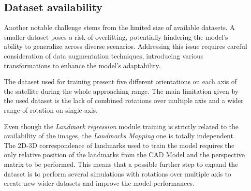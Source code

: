 \subsection{Dataset availability}
\label{Chapter4/DatasetAv}
Another notable challenge stems from the limited size of available datasets. A smaller dataset poses a risk of overfitting, potentially hindering the model's ability to generalize across diverse scenarios. Addressing this issue requires careful consideration of data augmentation techniques, introducing various transformations to enhance the model's adaptability.

The dataset used for training present five different orientations on each axis of the satellite during the whole approaching range. The main limitation given by the used dataset is the lack of combined rotations over multiple axis and a wider range of rotation on single axis.

Even though the \textit{Landmark regression} module training is strictly related to the availability of the images, the \textit{Landmarks Mapping} one is totally independent. The 2D-3D correspondence of landmarks used to train the model requires the only relative position of the landmarks from the CAD Model and the perspective matrix to be performed. This means that a possible further step to expand the dataset is to perform several simulations with rotations over multiple axis to create new wider datasets and improve the model performances.





